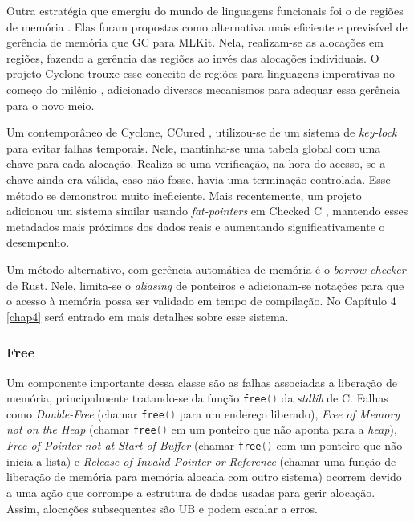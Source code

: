 \label{sec:mem-error:MemReg}
Outra estratégia que emergiu do mundo de linguagens funcionais foi o de regiões de memória \cite{REGMEM}. Elas foram propostas como alternativa mais eficiente e previsível de gerência de memória que GC para MLKit. Nela, realizam-se as alocações em regiões, fazendo a gerência das regiões ao invés das alocações individuais. O projeto Cyclone trouxe esse conceito de regiões para linguagens imperativas no começo do milênio \cite{CYCLONEMEM}, adicionado diversos mecanismos para adequar essa gerência para o novo meio.

\label{sec:mem-error:KeyLock}
Um contemporâneo de Cyclone, CCured \cite{CCURED}, utilizou-se de um sistema de \emph{key-lock} para evitar falhas temporais. Nele, mantinha-se uma tabela global com uma chave para cada alocação. Realiza-se uma verificação, na hora do acesso, se a chave ainda era válida, caso não fosse, havia uma terminação controlada. Esse método se demonstrou muito ineficiente. Mais recentemente, um projeto adicionou um sistema similar usando \emph{fat-pointers} em Checked C \cite{FATPOINTERS}, mantendo esses metadados mais próximos dos dados reais e aumentando significativamente o desempenho.

\label{sec:mem-error:BorrowChecker}
Um método alternativo, com gerência automática de memória é o \emph{borrow checker} de Rust. Nele, limita-se o \emph{aliasing} de ponteiros e adicionam-se notações para que o acesso à memória possa ser validado em tempo de compilação. No Capítulo 4 \ref{chap4} será entrado em mais detalhes sobre esse sistema.

\subsubsection{Free}
\label{sec:mem-error:temporal:free}

\newcommand{\FREE}{\lstinline[language=C]|free()| }

Um componente importante dessa classe são as falhas associadas a liberação de memória, principalmente tratando-se da função \FREE da \emph{stdlib} de C. Falhas como \emph{Double-Free} (chamar \FREE para um endereço liberado), \emph{Free of Memory not on the Heap} (chamar \FREE em um ponteiro que não aponta para a \emph{heap}), \emph{Free of Pointer not at Start of Buffer} (chamar \FREE com um ponteiro que não inicia a lista) e \emph{Release of Invalid Pointer or Reference} (chamar uma função de liberação de memória para memória alocada com outro sistema) ocorrem devido a uma ação que corrompe a estrutura de dados usadas para gerir alocação. Assim, alocações subsequentes são UB e podem escalar a erros.

